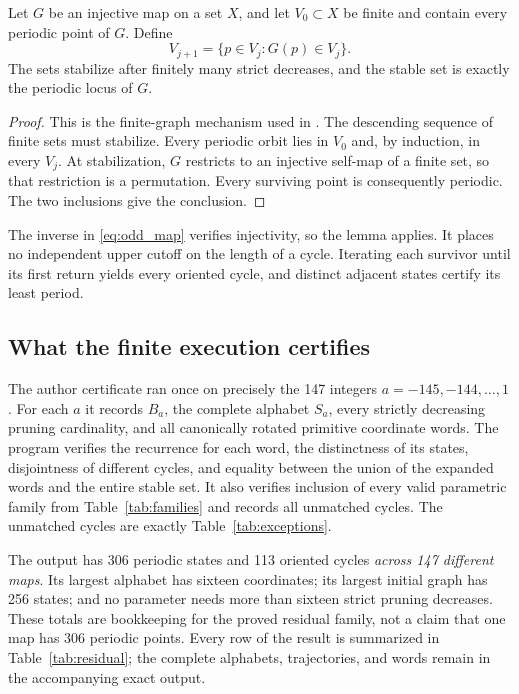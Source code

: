 \begin{lemma}
\label{lem:pruning}
Let $G$ be an injective map on a set $X$, and let $V_0\subset X$
be finite and contain every periodic point of $G$.
Define
\begin{equation}
 V_{j+1}=\{p\in V_j:G(p)\in V_j\}.
 \label{eq:prune}
\end{equation}
The sets stabilize after finitely many strict decreases, and the
stable set is exactly the periodic locus of $G$.
\end{lemma}
\begin{proof}
This is the finite-graph mechanism used in
\cite[Section 5]{c412}. The descending sequence of finite sets
must stabilize. Every periodic orbit lies in $V_0$ and, by induction,
in every $V_j$. At stabilization, $G$ restricts to an injective
self-map of a finite set, so that restriction is a permutation.
Every surviving point is consequently periodic. The two inclusions
give the conclusion.
\end{proof}

The inverse in \eqref{eq:odd_map} verifies injectivity, so the lemma
applies. It places no independent upper cutoff on the length of a
cycle. Iterating each survivor until its first return yields every
oriented cycle, and distinct adjacent states certify its least period.

\subsection{What the finite execution certifies}

The author certificate ran once on precisely the 147 integers
$a=-145,-144,\ldots,1$. For each $a$ it records $B_a$, the complete
alphabet $S_a$, every strictly decreasing pruning cardinality,
and all canonically rotated primitive coordinate words.
The program verifies the recurrence for each word, the distinctness
of its states, disjointness of different cycles, and equality between
the union of the expanded words and the entire stable set.
It also verifies inclusion of every valid parametric family from
Table~\ref{tab:families} and records all unmatched cycles.
The unmatched cycles are exactly Table~\ref{tab:exceptions}.

The output has 306 periodic states and 113 oriented cycles
\emph{across 147 different maps}. Its largest alphabet has sixteen
coordinates; its largest initial graph has 256 states; and no
parameter needs more than sixteen strict pruning decreases.
These totals are bookkeeping for the proved residual family, not
a claim that one map has 306 periodic points.
Every row of the result is summarized in
Table~\ref{tab:residual}; the complete alphabets, trajectories,
and words remain in the accompanying exact output.

